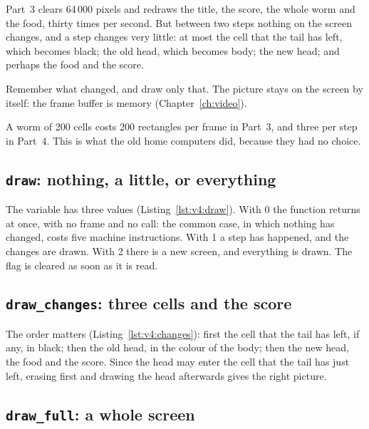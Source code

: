 Part~3 clears 64\,000 pixels and redraws the title, the score, the whole worm
and the food, thirty times per second. But between two steps nothing on the
screen changes, and a step changes very little: at most the cell that the
tail has left, which becomes black; the old head, which becomes body; the new
head; and perhaps the food and the score.

\begin{prgconcept}
Remember what changed, and draw only that. The picture stays on the screen by
itself: the frame buffer is memory (Chapter~\ref{ch:video}).
\end{prgconcept}

A worm of 200 cells costs 200 rectangles per frame in Part~3, and three per
step in Part~4. This is what the old home computers did, because they had no
choice.

\subsection{\texttt{draw}: nothing, a little, or everything}


The variable  has three values (Listing~\ref{lst:v4:draw}). With
0 the function returns at once, with no frame and no call: the common case,
in which nothing has changed, costs five machine instructions. With 1 a step
has happened, and the changes are drawn. With 2 there is a new screen, and
everything is drawn. The flag is cleared as soon as it is read.

\subsection{\texttt{draw\_changes}: three cells and the score}


The order matters (Listing~\ref{lst:v4:changes}): first the cell that the
tail has left, if any, in black; then the old head, in the colour of the
body; then the new head, the food and the score. Since the head may enter the
cell that the tail has just left, erasing first and drawing the head
afterwards gives the right picture.

\subsection{\texttt{draw\_full}: a whole screen}

